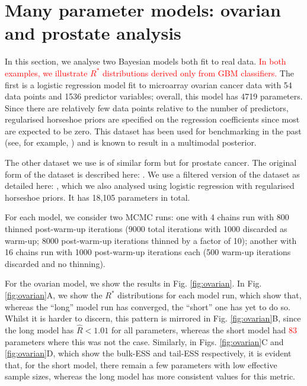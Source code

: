 \documentclass{article}
\begin{document}
\section{Many parameter models: ovarian and prostate analysis}\label{sec:prostate}
In this section, we analyse two Bayesian models both fit to real data. \textcolor{red}{In both examples, we illustrate $R^*$ distributions derived only from GBM classifiers.} The first is a logistic regression model fit to microarray ovarian cancer data with 54 data points and 1536 predictor variables; overall, this model has 4719 parameters. Since there are relatively few data points relative to the number of predictors, regularised horseshoe priors are specified on the regression coefficients \citep{piironen2017sparsity} since most are expected to be zero. This dataset has been used for benchmarking in the past (see, for example, \cite{schummer1999comparative,hernandez2010expectation,paananen2019implicitly}) and is known to result in a multimodal posterior.

The other dataset we use is of similar form but for prostate cancer. The original form of the dataset is described here: \cite{singh2002gene}. We use a filtered version of the dataset as detailed here: \cite{yang2006stable}, which we also analysed using logistic regression with regularised horseshoe priors. It has 18,105 parameters in total. 

For each model, we consider two MCMC runs: one with 4 chains run with 800 thinned post-warm-up iterations (9000 total iterations with 1000 discarded as warm-up; 8000 post-warm-up iterations thinned by a factor of 10); another with 16 chains run with 1000 post-warm-up iterations each (500 warm-up iterations discarded and no thinning).

For the ovarian model, we show the results in Fig. \ref{fig:ovarian}. In Fig. \ref{fig:ovarian}A, we show the $R^*$ distributions for each model run, which show that, whereas the ``long'' model run has converged, the ``short'' one has yet to do so. Whilst it is harder to discern, this pattern is mirrored in Fig. \ref{fig:ovarian}B, since the long model has $\widehat{R}<1.01$ for all parameters, whereas the short model had \textcolor{red}{83} parameters where this was not the case. Similarly, in Figs. \ref{fig:ovarian}C and \ref{fig:ovarian}D, which show the bulk-ESS and tail-ESS respectively, it is evident that, for the short model, there remain a few parameters with low effective sample sizes, whereas the long model has more consistent values for this metric.
\end{document}
